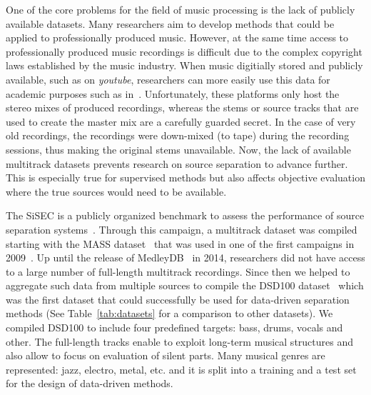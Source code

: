 One of the core problems for the field of music processing is the lack of publicly available datasets.
Many researchers aim to develop methods that could be applied to professionally produced music. 
However, at the same time access to professionally produced music recordings is difficult due to the complex copyright laws established by the music industry.
When music digitially stored and publicly available, such as on \emph{youtube}, researchers can more easily use this data for academic purposes such as in~\cite{balke17}.
Unfortunately, these platforms only host the stereo mixes of produced recordings, whereas the stems or source tracks that are used to create the master mix are a carefully guarded secret.
In the case of very old recordings, the recordings were down-mixed (to tape) during the recording sessions, thus making the original stems unavailable.
Now, the lack of available multitrack datasets prevents research on source separation to advance further.
This is especially true for supervised methods but also affects objective evaluation where the true sources would need to be available.
\par
The \ac{SiSEC} is a publicly organized benchmark to assess the performance of source separation systems~\cite{sisec13, ono15, liutkus17, stoeter18sisec}. 
Through this campaign, a multitrack dataset was compiled starting with the MASS dataset~\cite{MTGMASSdb} that was used in one of the first campaigns in 2009~\cite{vincent09}.
Up until the release of MedleyDB~\cite{bittner14} in 2014, researchers did not have access to a large number of full-length multitrack recordings.
Since then we helped to aggregate such data from multiple sources to compile the DSD100 dataset~\cite{liutkus17} which was the first dataset that could successfully be used for data-driven separation methods (See Table~\ref{tab:datasets} for a comparison to other datasets).
We compiled DSD100 to include four predefined targets: bass, drums, vocals and other.
The full-length tracks enable to exploit long-term musical structures and also allow to focus on evaluation of silent parts.
Many musical genres are represented: jazz, electro, metal, etc. and it is split into a training and a test set for the design of data-driven methods.

